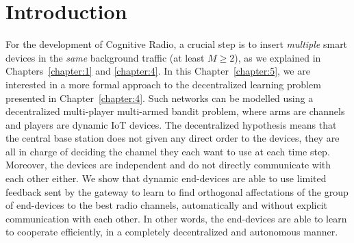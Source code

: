 


\section{Introduction}
\label{sec:5:introduction}

For the development of Cognitive Radio, a crucial step is to insert \emph{multiple} smart devices in the \emph{same} background traffic (at least $M \geq 2$), as we explained in Chapters~\ref{chapter:1} and \ref{chapter:4}.
%
In this Chapter~\ref{chapter:5}, we are interested in a more formal approach to the decentralized learning problem presented in Chapter~\ref{chapter:4}.
Such networks can be modelled using a decentralized multi-player multi-armed bandit problem, where arms are channels and players are dynamic IoT devices.
%
The decentralized hypothesis means that the central base station does not given any direct order to the devices, they are all in charge of deciding the channel they each want to use at each time step.
Moreover, the devices are independent and do not directly communicate with each other either.
We show that dynamic end-devices are able to use limited feedback sent by the gateway to learn to find orthogonal affectations of the group of end-devices to the best radio channels, automatically and without explicit communication with each other.
In other words, the end-devices are able to learn to cooperate efficiently, in a completely decentralized and autonomous manner.


